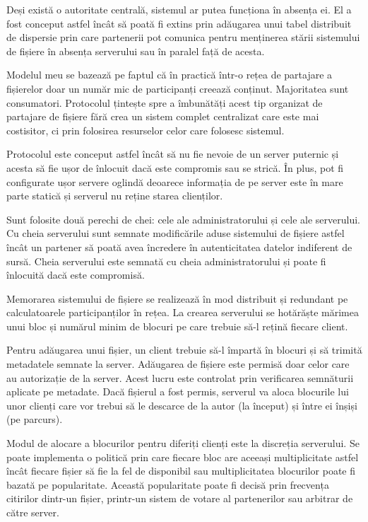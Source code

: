 \documentclass[a4wide,12pt]{report}
\begin{document}
Deși există o autoritate centrală, sistemul ar putea funcționa în absența ei. El a fost conceput astfel încât să poată
fi extins prin adăugarea unui tabel distribuit de dispersie prin care partenerii pot comunica pentru menținerea stării
sistemului de fișiere în absența serverului sau în paralel față de acesta.

Modelul meu se bazează pe faptul că în practică într-o rețea de partajare a fișierelor doar un număr mic de participanți
creează conținut. Majoritatea sunt consumatori. Protocolul țintește spre a îmbunătăți acest tip organizat de partajare
de fișiere fără crea un sistem complet centralizat care este mai costisitor, ci prin folosirea resurselor celor care
folosesc sistemul.

Protocolul este conceput astfel încât să nu fie nevoie de un server puternic și acesta să fie ușor de înlocuit dacă este
compromis sau se strică. În plus, pot fi configurate ușor servere oglindă deoarece informația de pe server este în mare
parte statică și serverul nu reține starea clienților.

Sunt folosite două perechi de chei: cele ale administratorului și cele ale serverului. Cu cheia serverului sunt semnate
modificările aduse sistemului de fișiere astfel încât un partener să poată avea încredere în autenticitatea datelor
indiferent de sursă. Cheia serverului este semnată cu cheia administratorului și poate fi înlocuită dacă este
compromisă.

Memorarea sistemului de fișiere se realizează în mod distribuit și redundant pe calculatoarele participanților în rețea.
La crearea serverului se hotărăște mărimea unui bloc și numărul minim de blocuri pe care trebuie să-l rețină fiecare
client.

Pentru adăugarea unui fișier, un client trebuie să-l împartă în blocuri și să trimită metadatele semnate la server.
Adăugarea de fișiere este permisă doar celor care au autorizație de la server. Acest lucru este controlat prin
verificarea semnăturii aplicate pe metadate. Dacă fișierul a fost permis, serverul va aloca blocurile lui unor clienți
care vor trebui să le descarce de la autor (la început) și între ei înșiși (pe parcurs).

Modul de alocare a blocurilor pentru diferiți clienți este la discreția serverului. Se poate implementa o politică prin
care fiecare bloc are aceeași multiplicitate astfel încât fiecare fișier să fie la fel de disponibil sau multiplicitatea
blocurilor poate fi bazată pe popularitate. Această popularitate poate fi decisă prin frecvența citirilor dintr-un
fișier, printr-un sistem de votare al partenerilor sau arbitrar de către server.
\end{document}
